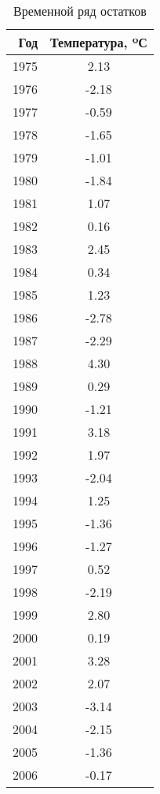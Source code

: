 \begin{table}[H]
\centering
\caption{Временной ряд остатков} 
\label{table:residuals}
\begin{tabular}{|rc|}
  \hline
Год & Температура, ºС \\ 
  \hline
1975 & 2.13 \\ 
  1976 & -2.18 \\ 
  1977 & -0.59 \\ 
  1978 & -1.65 \\ 
  1979 & -1.01 \\ 
  1980 & -1.84 \\ 
  1981 & 1.07 \\ 
  1982 & 0.16 \\ 
  1983 & 2.45 \\ 
  1984 & 0.34 \\ 
  1985 & 1.23 \\ 
  1986 & -2.78 \\ 
  1987 & -2.29 \\ 
  1988 & 4.30 \\ 
  1989 & 0.29 \\ 
  1990 & -1.21 \\ 
  1991 & 3.18 \\ 
  1992 & 1.97 \\ 
  1993 & -2.04 \\ 
  1994 & 1.25 \\ 
  1995 & -1.36 \\ 
  1996 & -1.27 \\ 
  1997 & 0.52 \\ 
  1998 & -2.19 \\ 
  1999 & 2.80 \\ 
  2000 & 0.19 \\ 
  2001 & 3.28 \\ 
  2002 & 2.07 \\ 
  2003 & -3.14 \\ 
  2004 & -2.15 \\ 
  2005 & -1.36 \\ 
  2006 & -0.17 \\ 
   \hline
\end{tabular}
\end{table}
